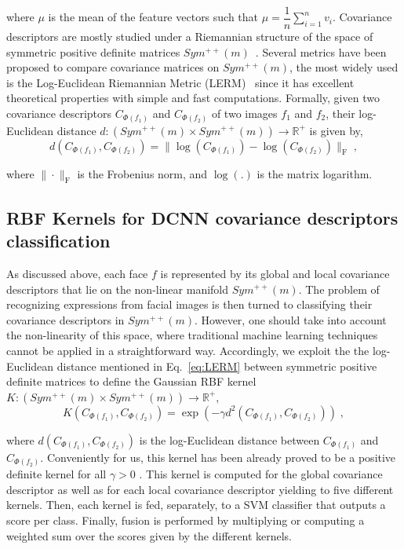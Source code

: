 \documentclass{bmvc2k}
\begin{document}
\noindent
where $\mu$ is the mean of the feature vectors such that $\mu=\dfrac{1}{n}\sum^{n}_{i=1}v_{i}$. Covariance descriptors are mostly studied under a Riemannian structure of the space of symmetric positive definite matrices $Sym^{++}(m)$~\cite{tuzel:2006,jayasumana2015kernel,wang2017discriminative}.
Several metrics have been proposed to compare covariance matrices on $Sym^{++}(m)$, the most widely used is the Log-Euclidean Riemannian Metric (LERM)~\cite{arsigny2006log} since it has excellent theoretical properties with simple and fast computations. 
Formally, given two covariance descriptors $C_{\Phi(f_1)}$ and $C_{\Phi(f_2)}$ of two images $f_{1}$ and $f_{2}$, their log-Euclidean distance $d: (Sym^{++}(m) \times Sym^{++}(m)) \rightarrow \mathbb{R}^{+}$ is given by,
%
\begin{equation}
\label{eq:LERM}
d(C_{\Phi(f_1)},C_{\Phi(f_2)})=\| \log(C_{\Phi(f_1)})-\log(C_{\Phi(f_2)} ) \|_{\textrm{F}} \; ,
\end{equation}

\noindent
where $\|\cdot\|_{\textrm{F}}$ is the Frobenius norm, and $\log(.)$ is the matrix logarithm. 

\subsection{RBF Kernels for DCNN covariance descriptors classification} 
As discussed above, each face $f$ is represented by its global and local covariance descriptors that lie on the non-linear manifold $Sym^{++}(m)$.
The problem of recognizing expressions from facial images is then turned to classifying their covariance descriptors in $Sym^{++}(m)$. However, one should take into account the non-linearity of this space, where traditional machine learning techniques cannot be applied in a straightforward way. Accordingly, we exploit the the log-Euclidean distance mentioned in Eq.~\eqref{eq:LERM} between symmetric positive definite matrices to define the Gaussian RBF kernel $K : (Sym^{++}(m) \times Sym^{++}(m)) \rightarrow \mathbb{R}^{+}$,
%
\begin{equation}
\label{eq:kernel}
K(C_{\Phi(f_1)}, C_{\Phi(f_2)})=\exp (-\gamma d^2(C_{\Phi(f_1)}, C_{\Phi(f_2)})) \; ,
\end{equation}

\noindent
where $d(C_{\Phi(f_1)}, C_{\Phi(f_2)})$ is the log-Euclidean distance between $C_{\Phi(f_1)}$ and $C_{\Phi(f_2)}$. Conveniently for us, this kernel has been already proved to be a positive definite kernel for all $\gamma > 0$ \cite{jayasumana2015kernel}. 
This kernel is computed for the global covariance descriptor as well as for each local covariance descriptor yielding to five different kernels. Then, each kernel is fed, separately, to a SVM classifier that outputs a score per class. Finally, fusion is performed by multiplying or computing a weighted sum over the scores given by the different kernels. 
\end{document}

